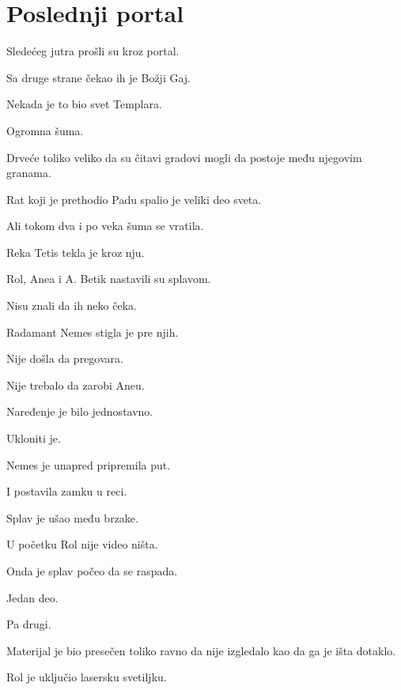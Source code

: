 
\chapter{Poslednji portal}


Sledećeg jutra prošli su kroz portal.

Sa druge strane čekao ih je Božji Gaj.

\bigskip

Nekada je to bio svet Templara.

Ogromna šuma.

Drveće toliko veliko da su čitavi gradovi mogli da postoje među njegovim granama.

Rat koji je prethodio Padu spalio je veliki deo sveta.

Ali tokom dva i po veka šuma se vratila.

\bigskip

Reka Tetis tekla je kroz nju.

Rol, Anea i A. Betik nastavili su splavom.

\bigskip

Nisu znali da ih neko čeka.

\bigskip

Radamant Nemes stigla je pre njih.

Nije došla da pregovara.

Nije trebalo da zarobi Aneu.

Naređenje je bilo jednostavno.

Ukloniti je.

\bigskip

Nemes je unapred pripremila put.

I postavila zamku u reci.

\bigskip

Splav je ušao među brzake.

U početku Rol nije video ništa.

Onda je splav počeo da se raspada.

Jedan deo.

Pa drugi.

Materijal je bio presečen toliko ravno da nije izgledalo kao da ga je išta dotaklo.

\bigskip

Rol je uključio lasersku svetiljku.

